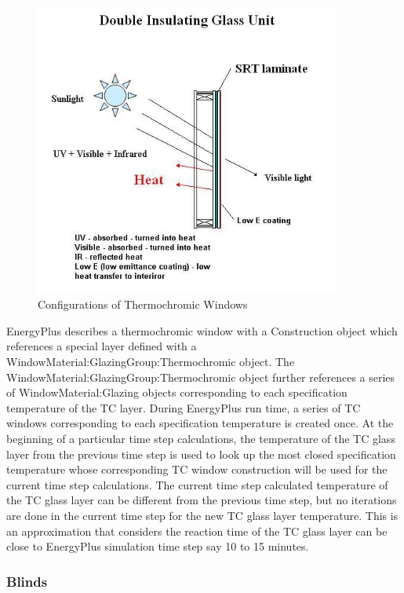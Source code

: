 \begin{figure}[hbtp] %
\centering
\includegraphics[width=0.9\textwidth, height=0.9\textheight, keepaspectratio=true]{media/image1017.png}
\caption{Configurations of Thermochromic Windows \protect \label{fig:configurations-of-thermochromic-windows}}
\end{figure}

EnergyPlus describes a thermochromic window with a Construction object which references a special layer defined with a WindowMaterial:GlazingGroup:Thermochromic object. The WindowMaterial:GlazingGroup:Thermochromic object further references a series of WindowMaterial:Glazing objects corresponding to each specification temperature of the TC layer. During EnergyPlus run time, a series of TC windows corresponding to each specification temperature is created once. At the beginning of a particular time step calculations, the temperature of the TC glass layer from the previous time step is used to look up the most closed specification temperature whose corresponding TC window construction will be used for the current time step calculations. The current time step calculated temperature of the TC glass layer can be different from the previous time step, but no iterations are done in the current time step for the new TC glass layer temperature. This is an approximation that considers the reaction time of the TC glass layer can be close to EnergyPlus simulation time step say 10 to 15 minutes.

\subsubsection{Blinds}\label{blinds}

